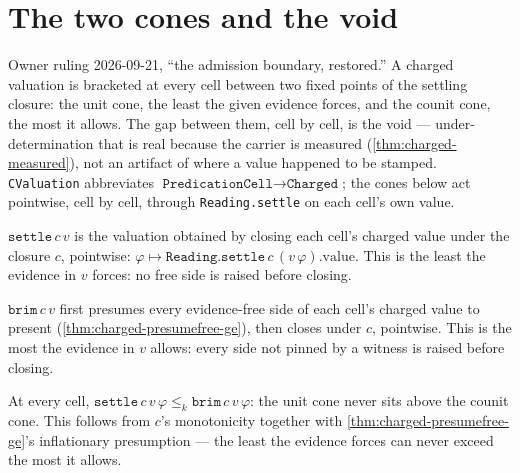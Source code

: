 \section{The two cones and the void}

Owner ruling 2026-09-21, ``the admission boundary, restored.'' A charged
valuation is bracketed at every cell between two fixed points of the settling
closure: the unit cone, the least the given evidence forces, and the counit
cone, the most it allows. The gap between them, cell by cell, is the void ---
under-determination that is real because the carrier is measured
(\cref{thm:charged-measured}), not an artifact of where a value happened to
be stamped. \texttt{CValuation} abbreviates \(\texttt{PredicationCell} \to
\texttt{Charged}\); the cones below act pointwise, cell by cell, through
\texttt{Reading.settle} on each cell's own value.

\begin{definition}\label{thm:cvaluation-settle}\leanok{}
\(\texttt{settle}\,c\,v\) is the valuation obtained by closing each cell's
charged value under the closure \(c\), pointwise:
\(\varphi \mapsto \texttt{Reading.settle}\,c\,(v\,\varphi).\mathrm{value}\).
This is the least the evidence in \(v\) forces: no free side is raised before
closing.
\end{definition}

\begin{definition}\label{thm:cvaluation-brim}\leanok{}
\(\texttt{brim}\,c\,v\) first presumes every evidence-free side of each
cell's charged value to present (\cref{thm:charged-presumefree-ge}), then
closes under \(c\), pointwise. This is the most the evidence in \(v\)
allows: every side not pinned by a witness is raised before closing.
\end{definition}

\begin{theorem}\label{thm:cvaluation-settle-le-brim}\leanok{}
At every cell, \(\texttt{settle}\,c\,v\,\varphi \le_k \texttt{brim}\,c\,v\,
\varphi\): the unit cone never sits above the counit cone. This follows from
\(c\)'s monotonicity together with \cref{thm:charged-presumefree-ge}'s
inflationary presumption --- the least the evidence forces can never exceed
the most it allows.
\end{theorem}

